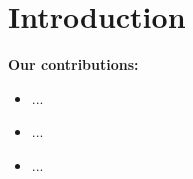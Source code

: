 \section{Introduction}

\noindent\textbf{Our contributions:}
\begin{itemize}
    \item ...
    \item ...
    \item ...
\end{itemize}